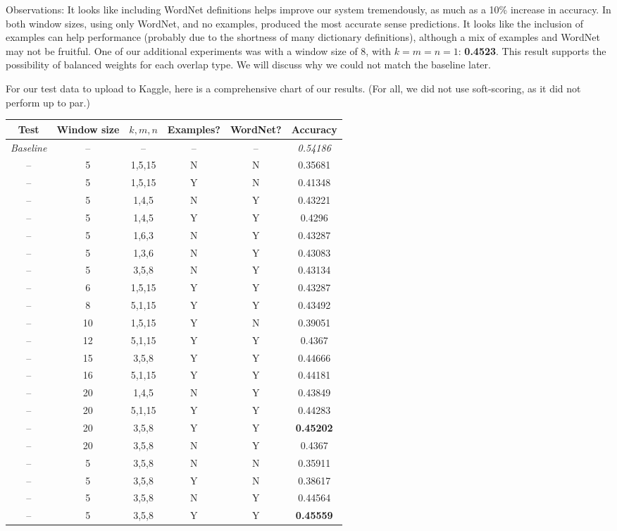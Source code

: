 \documentclass{article}
\begin{document}
Observations: It looks like including WordNet definitions helps improve our system tremendously, as much as a 10\% increase in accuracy. In both window sizes, using only WordNet, and no examples, produced the most accurate sense predictions. It looks like the inclusion of examples can help performance (probably due to the shortness of many dictionary definitions), although a mix of examples and WordNet may not be fruitful. One of our additional experiments was with a window size of 8, with $k = m = n = 1$: \textbf{0.4523}. This result supports the possibility of balanced weights for each overlap type. We will discuss why we could not match the baseline later.\bigskip

For our test data to upload to Kaggle, here is a comprehensive chart of our results. (For all, we did not use soft-scoring, as it did not perform up to par.)\par

{\footnotesize\begin{tabular}{|c|c|c|c|c|c|}\hline
Test & Window size & $k,m,n$ & Examples? & WordNet? & Accuracy\\\hline
\textit{Baseline} & -- & -- & -- & -- & \textit{0.54186}\\
-- & 5 & 1,5,15 & N & N & 0.35681\\
-- & 5 & 1,5,15 & Y & N & 0.41348\\
-- & 5 & 1,4,5  & N & Y & 0.43221\\
-- & 5 & 1,4,5  & Y & Y & 0.4296\\
-- & 5 & 1,6,3  & N & Y & 0.43287\\
-- & 5 & 1,3,6  & N & Y & 0.43083\\
-- & 5 & 3,5,8  & N & Y & 0.43134\\
-- & 6 & 1,5,15 & Y & Y & 0.43287\\
-- & 8 & 5,1,15 & Y & Y & 0.43492\\
-- & 10 & 1,5,15 & Y & N & 0.39051\\
-- & 12 & 5,1,15 & Y & Y & 0.4367\\
-- & 15 & 3,5,8  & Y & Y & 0.44666\\
-- & 16 & 5,1,15 & Y & Y & 0.44181\\
-- & 20 & 1,4,5 & N & Y & 0.43849\\
-- & 20 & 5,1,15 & Y & Y & 0.44283\\
-- & 20 & 3,5,8  & Y & Y & \textbf{0.45202}\\
-- & 20 & 3,5,8  & N & Y & 0.4367\\\hline
-- & 5 & 3,5,8 & N & N & 0.35911\\
-- & 5 & 3,5,8 & Y & N & 0.38617\\
-- & 5 & 3,5,8 & N & Y & 0.44564\\
-- & 5 & 3,5,8 & Y & Y & \textbf{0.45559}\\\hline\end{tabular}}
\end{document}
